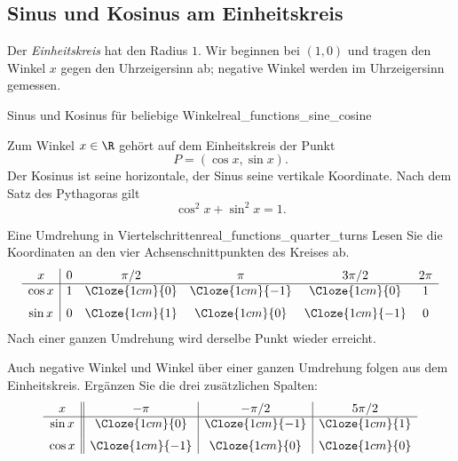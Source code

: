 \subsection{Sinus und Kosinus am Einheitskreis}
\label{subsec:real_functions_unit_circle}
Der \emph{Einheitskreis}  hat den Radius $1$.
Wir beginnen bei $(1,0)$ und tragen den Winkel $x$ gegen den Uhrzeigersinn
ab; negative Winkel werden im Uhrzeigersinn gemessen.
\par\noindent\begin{minipage}{\linewidth}
\begin{DefinitionBox}{Sinus und Kosinus für beliebige Winkel}{real_functions_sine_cosine}
  \begin{minipage}[c]{0.49\linewidth}
    Zum Winkel $x\in\R$ gehört auf dem Einheitskreis der Punkt
    \[
      P=(\cos x,\sin x).
    \]
    Der Kosinus ist seine horizontale, der Sinus seine vertikale Koordinate.
    Nach dem Satz des Pythagoras gilt
    \[
      \cos^2x+\sin^2x=1.
    \]
  \end{minipage}\hfill
  \begin{minipage}[c]{0.47\linewidth}
    \centering
  \end{minipage}
\end{DefinitionBox}
\begin{ExampleBox}[before skip=0.3\baselineskip]{Eine Umdrehung in Viertelschritten}{real_functions_quarter_turns}
  Lesen Sie die Koordinaten an den vier Achsenschnittpunkten des Kreises ab.
  \[
    \begin{array}{c|ccccc}
      x&0&\pi/2&\pi&3\pi/2&2\pi\\ \hline
      \cos x&1&\Cloze{1cm}{0}&\Cloze{1cm}{-1}&\Cloze{1cm}{0}&1\\[0.6em]
      \sin x&0&\Cloze{1cm}{1}&\Cloze{1cm}{0}&\Cloze{1cm}{-1}&0
    \end{array}
  \]
  Nach einer ganzen Umdrehung wird derselbe Punkt wieder erreicht.
\end{ExampleBox}
\end{minipage}

Auch negative Winkel und Winkel über einer ganzen Umdrehung folgen
aus dem Einheitskreis. Ergänzen Sie die drei zusätzlichen Spalten:
\[
  \begin{array}{c||c|c|c}
    x&-\pi&-\pi/2&5\pi/2\\\hline
    \sin x&\Cloze{1cm}{0}&\Cloze{1cm}{-1}&\Cloze{1cm}{1}\\[0.6em]
    \cos x&\Cloze{1cm}{-1}&\Cloze{1cm}{0}&\Cloze{1cm}{0}
  \end{array}
\]

